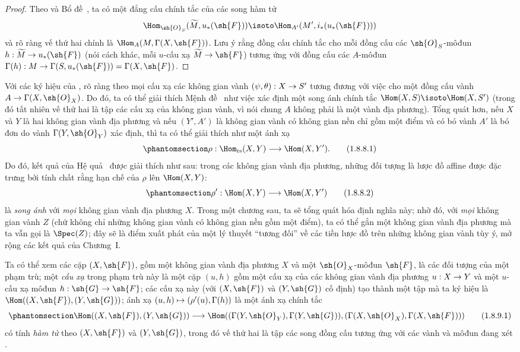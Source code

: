 \documentclass[oneside]{amsart}
\makeatletter
\newcommand{\ega@arrow}[2]{\mathchoice{#1}{#2}{#2}{#2}}
\let\ega@shortmapsto\mapsto
\renewcommand{\to}{\ega@arrow{\longrightarrow}{\rightarrow}}
\renewcommand{\mapsto}{\ega@arrow{\longmapsto}{\ega@shortmapsto}}
\newcommand{\oldpage}[2][]{{\marginnote{\normalfont\textbf{#1}~|~#2}}\ignorespaces}
\let\EGAOriginalLabel\label
\renewcommand{\label}[1]{\phantomsection\EGAOriginalLabel{#1}}
\makeatother
\begin{document}
\begin{proof}
Theo  và Bổ đề~, ta có một đẳng cấu
chính tắc của các song hàm tử
\[
  \Hom_{\sh{O}_S}(\widetilde{M},u_*(\sh{F}))\isoto\Hom_{A'}(M',i_*(u_*(\sh{F})))
\]
và rõ ràng vế thứ hai chính là $\Hom_A(M,\Gamma(X,\sh{F}))$.
Lưu ý rằng đồng cấu chính tắc  cho mỗi đồng cấu các
$\sh{O}_S$-môđun $h:\widetilde{M}\to u_*(\sh{F})$ (nói cách khác, mỗi
$u$-cấu xạ $\widetilde{M}\to\sh{F}$) tương ứng với đồng cấu các
$A$-môđun $\Gamma(h):M\to\Gamma(S,u_*(\sh{F}))=\Gamma(X,\sh{F})$.
\end{proof}

\begin{env}[1.8.8]
\label{I.1.8.8}
Với các ký hiệu của , rõ ràng theo  mọi
cấu xạ các không gian vành $(\psi,\theta):X\to S'$ tương đương với việc
cho một đồng cấu vành $A\to\Gamma(X,\sh{O}_X)$.
Do đó, ta có thể giải thích Mệnh đề~ như việc xác định một
song ánh chính tắc $\Hom(X,S)\isoto\Hom(X,S')$ (trong đó tất nhiên vế
thứ hai là tập các cấu xạ của không gian vành, vì nói chung $A$ không
phải là một vành địa phương).
Tổng quát hơn, nếu $X$ và $Y$ là hai không gian vành địa phương và nếu
$(Y',A')$ là không gian vành có không gian nền chỉ gồm một điểm và có bó
vành $A'$ là bó đơn do vành $\Gamma(Y,\sh{O}_Y)$ xác định, thì ta có thể
giải thích  như một ánh xạ
\[
  \label{I.1.8.8.1}
  \rho:\Hom_\text{rs}(X,Y)\to\Hom(X,Y').
  \tag{1.8.8.1}
\]
Do đó, kết quả của Hệ quả~ được giải thích như sau: trong
các không gian vành địa phương, những đối tượng là lược đồ affine được
đặc trưng bởi tính chất rằng hạn chế của $\rho$ lên
$\Hom(X,Y)$:
\[
  \label{I.1.8.8.2}
  \rho':\Hom(X,Y)\to\Hom(X,Y')
  \tag{1.8.8.2}
\]
là \emph{song ánh} với \emph{mọi} không gian vành địa phương $X$.
Trong một chương sau, ta sẽ tổng quát hóa định nghĩa này; nhờ đó, với
\emph{mọi} không gian vành $Z$ (chứ không chỉ những không gian vành có
không gian nền gồm một điểm), ta có thể gắn một không gian vành địa
phương mà ta vẫn gọi là $\Spec(Z)$;
đây sẽ là điểm xuất phát của một lý thuyết ``tương đối'' về các tiền
lược đồ trên những không gian vành tùy ý, mở rộng các kết quả của
Chương~I.
\end{env}

\begin{env}[1.8.9]
\label{I.1.8.9}
Ta có thể xem các cặp $(X,\sh{F})$, gồm một không gian vành địa phương
$X$ và một $\sh{O}_X$-môđun $\sh{F}$, là các đối tượng của một phạm trù;
một \emph{cấu xạ} trong phạm trù này là một cặp $(u,h)$ gồm một cấu xạ
của các không gian vành địa phương
\oldpage[II]{221}
$u:X\to Y$ và một $u$-cấu xạ môđun $h:\sh{G}\to\sh{F}$;
các cấu xạ này (với $(X,\sh{F})$ và $(Y,\sh{G})$ cố định) tạo thành một
tập mà ta ký hiệu là $\Hom((X,\sh{F}),(Y,\sh{G}))$;
ánh xạ $(u,h)\mapsto(\rho'(u),\Gamma(h))$ là một ánh xạ chính tắc
\[
  \label{I.1.8.9.1}
  \Hom((X,\sh{F}),(Y,\sh{G}))\to\Hom((\Gamma(Y,\sh{O}_Y),\Gamma(Y,\sh{G})),(\Gamma(X,\sh{O}_X),\Gamma(X,\sh{F})))
  \tag{1.8.9.1}
\]
có tính \emph{hàm tử} theo $(X,\sh{F})$ và $(Y,\sh{G})$, trong đó vế
thứ hai là tập các song đồng cấu tương ứng với các vành và môđun đang
xét .
\end{env}
\end{document}
